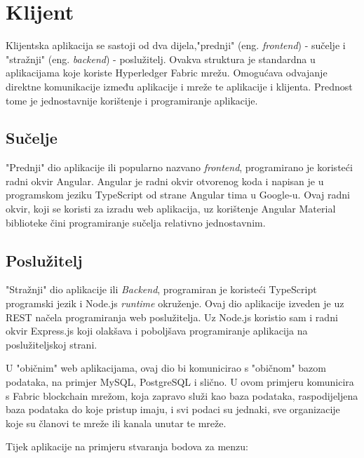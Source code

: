 \documentclass[times, utf8, diplomski]{fer}
\begin{document}
\section{Klijent}

Klijentska aplikacija se sastoji od dva dijela,"prednji" (eng. \textit{frontend}) - sučelje i "stražnji" (eng. \textit{backend}) - poslužitelj. Ovakva struktura je standardna u aplikacijama koje koriste Hyperledger Fabric mrežu.  Omogućava odvajanje direktne komunikacije između aplikacije i mreže te aplikacije i klijenta. Prednost tome je jednostavnije korištenje i programiranje aplikacije. 
\subsection{Sučelje}

"Prednji" dio aplikacije ili popularno nazvano \textit{frontend},  programirano je koristeći radni okvir Angular.  Angular je radni okvir otvorenog koda i napisan je u programskom jeziku TypeScript od strane Angular tima u Google-u. Ovaj radni okvir,  koji se koristi za izradu web aplikacija, uz korištenje Angular Material biblioteke čini programiranje sučelja relativno jednostavnim. 

\subsection{Poslužitelj}

"Stražnji" dio aplikacije ili \textit{Backend}, programiran je koristeći TypeScript programski jezik i Node.js \textit{runtime} okruženje.  Ovaj dio aplikacije izveden je uz REST načela \cite{BATTLE200861} programiranja web poslužitelja. Uz Node.js koristio sam i radni okvir Express.js koji olakšava i poboljšava programiranje aplikacija na poslužiteljskoj strani.%

U "običnim" web aplikacijama, ovaj dio bi komunicirao s "običnom" bazom podataka, na primjer MySQL, PostgreSQL i slično. U ovom primjeru komunicira s Fabric blockchain mrežom, koja zapravo služi kao baza podataka, raspodijeljena baza podataka do koje pristup imaju, i svi podaci su jednaki, sve organizacije koje su članovi te mreže ili kanala unutar te mreže. 

Tijek aplikacije na primjeru stvaranja bodova za menzu:
\end{document}
